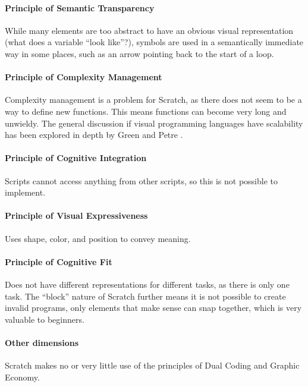 \paragraph{Principle of Semantic Transparency}
While many elements are too abstract to have an obvious visual representation (what does a variable ``look like''?), symbols are used in a semantically immediate way in some places, such as an arrow pointing back to the start of a loop. 

\paragraph{Principle of Complexity Management}
Complexity management is a problem for Scratch, as there does not seem to be a way to define new functions. This means functions can become very long and unwieldy. The general discussion if visual programming languages have scalability has been explored in depth by Green and Petre \cite{green1992visual}.

\paragraph{Principle of Cognitive Integration}
Scripts cannot access anything from other scripts, so this is not possible to implement. 

\paragraph{Principle of Visual Expressiveness}
Uses shape, color, and position to convey meaning. 

\paragraph{Principle of Cognitive Fit}
Does not have different representations for different tasks, as there is only one task. The ``block'' nature of Scratch further means it is not possible to create invalid programs, only elements that make sense can snap together, which is very valuable to beginners.

\paragraph{Other dimensions}
Scratch makes no or very little use of the principles of Dual Coding and Graphic Economy.

